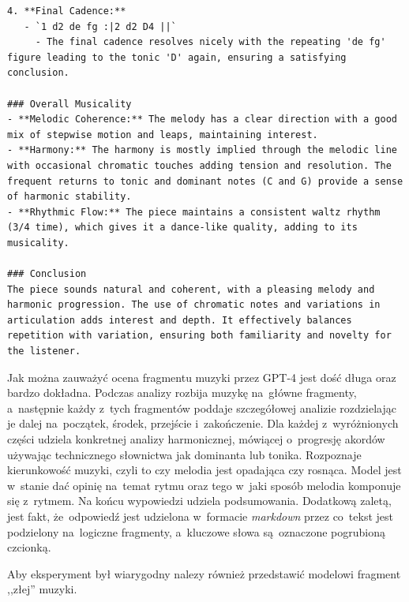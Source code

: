 \documentclass[data-science]{agh-wi} %
\begin{document}
\begin{verbatim}
4. **Final Cadence:**
   - `1 d2 de fg :|2 d2 D4 ||`
     - The final cadence resolves nicely with the repeating 'de fg' figure leading to the tonic 'D' again, ensuring a satisfying conclusion.

### Overall Musicality
- **Melodic Coherence:** The melody has a clear direction with a good mix of stepwise motion and leaps, maintaining interest.
- **Harmony:** The harmony is mostly implied through the melodic line with occasional chromatic touches adding tension and resolution. The frequent returns to tonic and dominant notes (C and G) provide a sense of harmonic stability.
- **Rhythmic Flow:** The piece maintains a consistent waltz rhythm (3/4 time), which gives it a dance-like quality, adding to its musicality.

### Conclusion
The piece sounds natural and coherent, with a pleasing melody and harmonic progression. The use of chromatic notes and variations in articulation adds interest and depth. It effectively balances repetition with variation, ensuring both familiarity and novelty for the listener.
\end{verbatim}

Jak można zauważyć ocena fragmentu muzyki przez GPT-4 jest dość długa oraz bardzo dokładna. Podczas analizy rozbija muzykę na~główne fragmenty, a~następnie każdy z~tych fragmentów poddaje szczegółowej analizie rozdzielając je dalej na~początek, środek, przejście i~zakończenie. Dla każdej z~wyróżnionych części udziela konkretnej analizy harmonicznej, mówiącej o~progresję akordów używając technicznego słownictwa jak dominanta lub tonika. Rozpoznaje kierunkowość muzyki, czyli to czy melodia jest opadająca czy rosnąca. Model jest w~stanie dać opinię na~temat rytmu oraz tego w~jaki sposób melodia komponuje się z~rytmem. Na końcu wypowiedzi udziela podsumowania. Dodatkową zaletą, jest fakt, że~odpowiedź jest udzielona w~formacie \textit{markdown} przez co~tekst jest podzielony na~logiczne fragmenty, a~kluczowe słowa są~oznaczone pogrubioną czcionką.

Aby eksperyment był wiarygodny nalezy również przedstawić modelowi fragment ,,złej'' muzyki.
\end{document}
